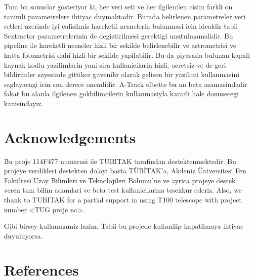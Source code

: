 \documentclass[review]{elsarticle}
\begin{document}
Tum bu sonuclar gosteriyor ki, her veri seti ve her ilgilenilen cisim farkli on tanimli parametrelere ihtiyac duymaktadir. Burada belirlenen parametreler veri setleri uzerinde iyi calisilmis hareketli nesnelerin bulunmasi icin idealdir tabii Sextractor parametrelerinin de degistirilmesi gerektigi unutulmamalidir. Bu pipeline ile hareketli nesneler hizli bir sekilde belirlenebilir ve astrometrisi ve hatta fotometrisi dahi hizli bir sekilde yapilabilir. Bu da piyasada bulunan kapali kaynak kodlu yazilimlarin yani sira kullanicilarin hizli, ucretsiz ve de geri bildirimler sayesinde gittikce guvenilir olarak gelisen bir yazilimi kullanmasini saglayacagi icin son derece onemlidir. A-Track elbette bu an beta asamasindadir fakat bu alanla ilgilenen gokbilimcilerin kullanmasiyla kararli hale donusecegi kanisindayiz.

\section*{Acknowledgements} \label{thanks}
Bu proje 114F477 numarasi ile TUBITAK tarafindan destektenmektedir. Bu projeye verdikleri destekten dolayi basta TÜBİTAK'a, Akdeniz Üniversitesi Fen Fakültesi Uzay Bilimleri ve Teknolojileri Bolumu'ne ve ayrica projeye destek veren tum bilim adamlari ve beta test kullanicilarina tesekkur ederiz. Also, we thank to TUBITAK for a partial support in using T100 telescope with project number <TUG proje no>. 

Gibi birsey kullanmamiz lazim. Tabii bu projede kullanilip kapatilmaya ihtiyac duyuluyorsa.

\section*{References}


\end{document}
